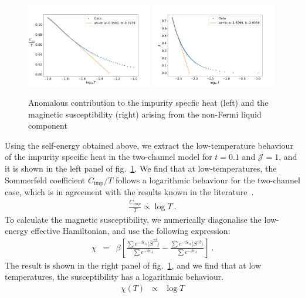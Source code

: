 \documentclass[12pt]{iopart}
\begin{document}
\begin{figure}[!htb]
\centering
\includegraphics[width=0.49\textwidth]{FINALfittedCvt0p1.png}
\includegraphics[width=0.49\textwidth]{NFLChilog0p1}
\caption{Anomalous contribution to the impurity specfic heat (left) and the maginetic susceptibility (right) arising from the non-Fermi liquid component}
\label{fig:Cv_imp}
\end{figure}
Using the self-energy obtained above, we extract the low-temperature behaviour of the impurity specific heat in the two-channel model for $t=0.1$ and $\mathcal{J}=1$, and it is shown in the left panel of fig.~\ref{fig:Cv_imp}. We find that at low-temperatures, the Sommerfeld coefficient \(C_\text{imp}/T\) follows a logarithmic behaviour for the two-channel case, which is in agreement with the results known in the literature~\cite{affleck_1991_overscreen,affleck_ludwig_1991,affleck_pang_cox_1992,affleck1993exact,
parcollet_olivier_large_N,affleck_2005,emery_kivelson,clarke_giamarchi_1993,zarand_2000,
vondelft_prl_1998,schofield_1997,bullaNRGreview,affleck_pang_cox_1992,pang_cox_1991,
andrei_destri_1984,Tsvelick1984,Tsvelick_1985,andrei_jerez_1995,zarand_costi_2002,
sengupta_1994,fabrizio_nozieres_1995,Coleman_tsvelik,fabrizio_gogolin_1995}.
\begin{eqnarray}
\frac{C_{imp}}{T} \propto \log T~.
\end{eqnarray}
To calculate the magnetic susceptibility, we numerically diagonalise the low-energy effective Hamiltonian, and use the following expression:
\begin{eqnarray}
\chi &=& \beta\left[\frac{\sum e^{-\beta \bar{\epsilon}_{\Lambda}} \langle \bar{S}^{z2} \rangle}{\sum e^{-\beta \bar{\epsilon}_{\Lambda}} } -\frac{\sum e^{-\beta \epsilon_{\Lambda}} \langle S^{z2 }\rangle }{\sum e^{-\beta \epsilon_{\Lambda}} } \right] ~.
\end{eqnarray}
The result is shown in the right panel of fig.~\ref{fig:Cv_imp}, and we find that at low temperatures, the susceptibility has a logarithmic behaviour.
\begin{eqnarray}
\chi(T) &\propto& \log T
\end{eqnarray}
\end{document}
